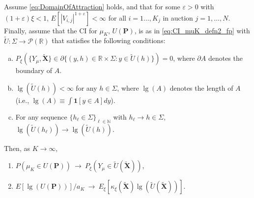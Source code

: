 \begin{theorem} \label{thm:CI_K_fp} 
Assume \eqref{eq:DomainOfAttraction} holds, and that for some $\varepsilon >0$ with $(1+\varepsilon)\xi<1$, $E[|V_{i,j}|^{1+\varepsilon}]<\infty $ for all $i=1\dots,K_j$ in auction $j=1,\dots,N$. Finally, assume that the CI for $\mu _{K}$, $U(\mathbf{P})$, is as in \eqref{eq:CI_muK_defn2_fp} with $\tilde{U}:\Sigma\to \mathcal{P}(\mathbb{R}) $ that satisfies the following conditions:
\begin{enumerate}[(a)]
\item $P_{\xi}(\{Y_{\mu },\mathbf{\tilde{X}}\}\in \partial \{(y,h)\in \mathbb{R} \times \Sigma:y\in \tilde{U}(h)\})=0$, where $\partial A$ denotes the boundary of $A$.%
\item $\lg (\tilde{U}(h))<\infty $ for any $h\in \Sigma$, where $ \lg (A)$ denotes the length of $A$ (i.e., $\lg (A)\equiv \int \mathbf{1} [y\in A]dy$).
\item For any sequence $\{h_{\ell}\in \Sigma\}_{\ell\in \mathbb{N}}$ with $ h_{\ell}\to h\in \Sigma$, $\lg (\tilde{U}(h_{\ell}))\to \lg (\tilde{U}(h))$.
\end{enumerate}
Then, as $K\to \infty $,
\begin{enumerate}
\item $P(\mu _{K}\in U(\mathbf{P}))~\to ~P_{\xi }(Y_{\mu }\in \tilde{ U}(\mathbf{\tilde{X}}))$,
\item $E[\lg (U(\mathbf{P}))]/a_{K}~\to ~E_{\xi }[\kappa _{\xi }( \mathbf{\tilde{X}})\lg (\tilde{U}(\mathbf{\tilde{X}}))]$.
\end{enumerate}
\end{theorem}
